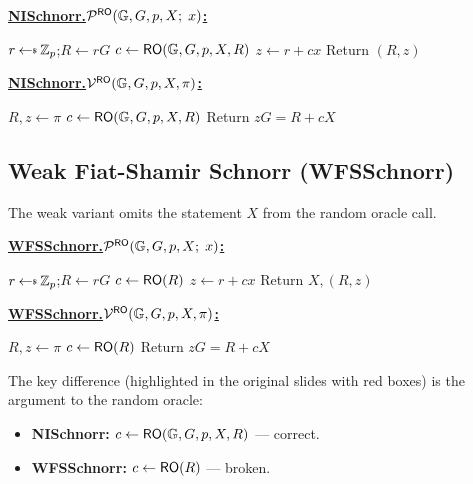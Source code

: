 \documentclass[11pt]{article}
\begin{document}
\begin{tcolorbox}[title={NISchnorr (correct Fiat-Shamir)},
                  colback=blue!5, colframe=blue!40!black]
\textbf{\underline{NISchnorr.$\mathcal{P}^{\mathsf{RO}}(\mathbb{G}, G, p, X;\; x)$:}}
\begin{algorithmic}[1]
  \State $r \getsr \Z_p$;\quad $R \leftarrow rG$
  \State $c \leftarrow \mathsf{RO}(\mathbb{G}, G, p, X, R)$  
  \State $z \leftarrow r + cx$
  \State Return $(R, z)$
\end{algorithmic}

\medskip
\textbf{\underline{NISchnorr.$\mathcal{V}^{\mathsf{RO}}(\mathbb{G}, G, p, X, \pi)$:}}
\begin{algorithmic}[1]
  \State $R, z \leftarrow \pi$
  \State $c \leftarrow \mathsf{RO}(\mathbb{G}, G, p, X, R)$  
  \State Return $zG = R + cX$
\end{algorithmic}
\end{tcolorbox}

\subsection{Weak Fiat-Shamir Schnorr (WFSSchnorr)}

The weak variant omits the statement $X$ from the random oracle call.

\begin{tcolorbox}[title={WFSSchnorr (weak / broken Fiat-Shamir)},
                  colback=red!5, colframe=red!50!black]
\textbf{\underline{WFSSchnorr.$\mathcal{P}^{\mathsf{RO}}(\mathbb{G}, G, p, X;\; x)$:}}
\begin{algorithmic}[1]
  \State $r \getsr \Z_p$;\quad $R \leftarrow rG$
  \State $c \leftarrow \mathsf{RO}(R)$  
  \State $z \leftarrow r + cx$
  \State Return $X, (R, z)$
\end{algorithmic}

\medskip
\textbf{\underline{WFSSchnorr.$\mathcal{V}^{\mathsf{RO}}(\mathbb{G}, G, p, X, \pi)$:}}
\begin{algorithmic}[1]
  \State $R, z \leftarrow \pi$
  \State $c \leftarrow \mathsf{RO}(R)$  
  \State Return $zG = R + cX$
\end{algorithmic}
\end{tcolorbox}

\noindent The key difference (highlighted in the original slides with red boxes)
is the argument to the random oracle:
\begin{itemize}
  \item \textbf{NISchnorr:} $c \leftarrow \mathsf{RO}(\mathbb{G}, G, p, X, R)$ --- correct.
  \item \textbf{WFSSchnorr:} $c \leftarrow \mathsf{RO}(R)$ --- broken.
\end{itemize}
\end{document}
